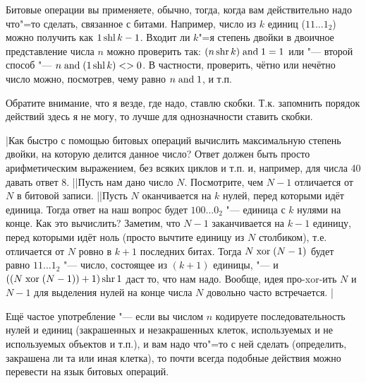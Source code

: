 Битовые операции вы применяете, обычно, тогда, когда вам действительно надо что"=то сделать, 
связанное с битами. Например, число из $k$ единиц ($11\dots1_2$) можно получить как $1\mathop{\mathrm{shl}} k-1$. 
Входит ли $k$"=я степень двойки в двоичное представление числа $n$ можно проверить так: $(n \mathop{\mathrm{shr}} k) 
\mathrel{\mathrm{and}} 1=1$ или "--- второй способ "--- $n \mathrel{\mathrm{and}} (1 \mathop{\mathrm{shl}} k)<>0$. В частности, проверить, чётно или нечётно число можно, 
посмотрев, чему равно $n \mathrel{\mathrm{and}} 1$, и т.п.

Обратите внимание, что я везде, где надо, ставлю скобки. Т.к. запомнить порядок действий здесь я не 
могу, то лучше для однозначности ставить скобки.

\task|Как быстро с помощью битовых операций вычислить максимальную степень двойки, на 
которую делится данное число? Ответ должен быть просто арифметическим выражением, без всяких циклов 
и т.п. и, например, для числа 40 давать ответ 8.
||Пусть нам дано число $N$. Посмотрите, чем $N-1$ отличается от $N$ в битовой записи.
||Пусть $N$ оканчивается на $k$ нулей, перед которыми идёт единица. Тогда ответ на наш вопрос будет $100\dots0_2$ "--- единица с $k$ нулями на конце. Как это вычислить? Заметим, что $N-1$ заканчивается на $k-1$ единицу, перед которыми идёт ноль (просто вычтите единицу из $N$ столбиком), т.е. отличается от $N$ ровно в $k+1$ последних битах. Тогда $N \mathrel{\mathrm{xor}} (N-1)$ будет равно $11\dots1_2$ "--- число, состоящее из $(k+1)$ единицы, "--- и $((N \mathrel{\mathrm{xor}} (N-1)) +1) \mathop{\mathrm{shr}} 1$ даст то, что нам надо. Вообще, идея про-xor-ить $N$ и $N-1$ для выделения нулей на конце числа $N$ довольно часто встречается.
|

Ещё частое употребление "--- если вы числом $n$ кодируете последовательность нулей и единиц 
(закрашенных и незакрашенных клеток, используемых и не используемых объектов и т.п.), и вам надо 
что"=то с ней сделать (определить, закрашена ли та или иная клетка), то почти всегда подобные действия можно перевести на язык битовых операций.